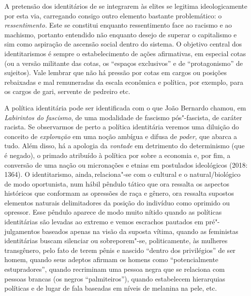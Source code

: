 A pretensão dos identitários de se integrarem às elites se legitima
ideologicamente por esta via, carregando consigo outro elemento bastante
problemático: o \emph{ressentimento.} Este se constitui enquanto
ressentimento face ao racismo e ao machismo, portanto entendido não
enquanto desejo de superar o capitalismo e sim como aspiração de
ascensão social dentro do sistema. O objetivo central dos identitarismos
é sempre o estabelecimento de ações afirmativas, em especial cotas (ou a
versão militante das cotas, os ``espaços exclusivos'' e de
``protagonismo'' de sujeitos). Vale lembrar que não há pressão por cotas
em cargos ou posições rebaixadas e mal remuneradas da escala econômica e
política, por exemplo, para os cargos de gari, servente de pedreiro etc.

A política identitária pode ser identificada com o que João Bernardo
chamou, em \emph{Labirintos do fascismo}, de uma modalidade de fascismo
pós"-fascista, de caráter racista. Se observarmos de perto a política
identitária veremos uma diluição do conceito de \emph{exploração} em uma
noção ambígua e difusa de \emph{poder,} que abarca a tudo. Além disso,
há a apologia da \emph{vontade} em detrimento do determinismo (que é
negado), o primado atribuído à política por sobre a economia e, por fim,
a conversão de uma nação ou micronações e etnias em postulados
ideológicos (2018: 1364). O identitarismo, ainda,\,relaciona"-se
com o cultural e o natural/biológico de modo oportunista, num hábil
pêndulo tático que ora ressalta os aspectos históricos que conformam as
opressões de raça e gênero, ora ressalta supostos elementos naturais
delimitadores da posição do indivíduo como oprimido ou opressor. Esse
pêndulo aparece de modo muito nítido quando as políticas identitárias
são levadas ao extremo e vemos escrachos pautados em pré"-julgamentos
baseados apenas na visão da suposta vítima, quando as feministas
identitárias buscam silenciar ou sobreporem"-se, politicamente, às
mulheres transgênero, pelo fato de terem pênis e nascido ``dentro dos
privilégios'' de ser homem, quando seus adeptos afirmam os homens como
``potencialmente estupradores'', quando recriminam uma pessoa negra que
se relaciona com pessoas brancas (os negros ``palmiteiros''), quando
estabelecem hierarquias políticas e de lugar de fala baseadas em níveis
de melanina na pele, etc.

